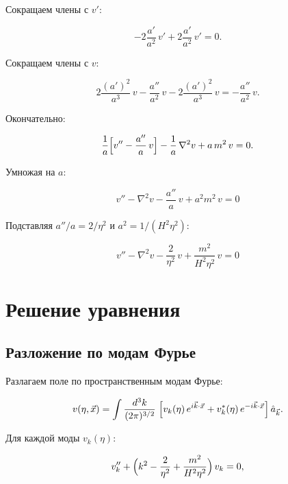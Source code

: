 \documentclass[12pt,a4paper]{article}
\begin{document}
Сокращаем члены с $v'$:

\begin{equation}
-2\frac{a'}{a^2}\,v' + 2\frac{a'}{a^2}\,v' = 0.
\end{equation}

Сокращаем члены с $v$:

\begin{equation}
2\frac{(a')^2}{a^3}\,v - \frac{a''}{a^2}\,v - 2\frac{(a')^2}{a^3}\,v = -\frac{a''}{a^2}\,v.
\end{equation}

Окончательно:

\begin{equation}
\frac{1}{a}\Bigl[v'' - \frac{a''}{a}\,v\Bigr] - \frac{1}{a}\,\nabla^2 v + a\,m^2\,v = 0.
\end{equation}

Умножая на $a$:

\begin{equation}
\boxed{\;v'' - \nabla^2 v - \frac{a''}{a}\,v + a^2m^2\,v = 0\;}
\end{equation}

Подставляя $a''/a = 2/\eta^2$ и $a^2 = 1/(H^2\eta^2)$:

\begin{equation}
\boxed{\;v'' - \nabla^2 v - \frac{2}{\eta^2}\,v + \frac{m^2}{H^2\eta^2}\,v = 0\;}
\end{equation}

\section{Решение уравнения}

\subsection{Разложение по модам Фурье}

Разлагаем поле по пространственным модам Фурье:

\begin{equation}
v(\eta, \vec{x}) = \int\frac{d^3k}{(2\pi)^{3/2}}\;\Bigl[v_k(\eta)\,e^{i\vec{k}\cdot\vec{x}} + v_k^*(\eta)\,e^{-i\vec{k}\cdot\vec{x}}\Bigr]\,\hat{a}_{\vec{k}}.
\end{equation}

Для каждой моды $v_k(\eta)$:

\begin{equation}
v_k'' + \Bigl(k^2 - \frac{2}{\eta^2} + \frac{m^2}{H^2\eta^2}\Bigr)\,v_k = 0,
\end{equation}
\end{document}
